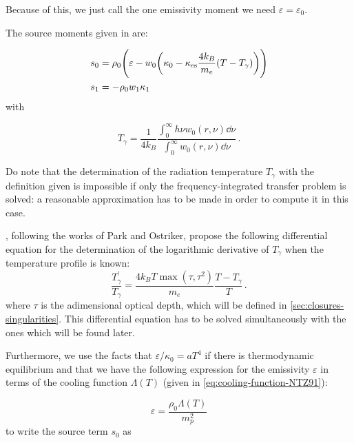\documentclass[main.tex]{subfiles}
\begin{document}
Because of this, we just call the one emissivity moment we need \(\varepsilon = \varepsilon_0\).

The source moments given in \cite[eq. 6]{NobiliTurollaZampieri:1991dec} are:

\begin{subequations}
\begin{align}
  s_0 &= \rho_0 \qty(\varepsilon - w_0 \qty(\kappa_0 - \kappa_{\text{es}} \frac{4 k_B}{m_e} (T - T_\gamma)))  \\
  s_1 &= - \rho_0 w_1 \kappa_1
\end{align}
\end{subequations}
with

\begin{equation}
    T_\gamma = \frac{1}{4 k_B} \frac{\displaystyle \int_0^\infty h \nu w_0 (r, \nu) \dd{\nu}}{\displaystyle \int_0^\infty w_0 (r, \nu) \dd{\nu}}\,.
\end{equation}

Do note that the determination of the radiation temperature \(T_\gamma\) with the definition given is impossible if only the frequency-integrated transfer problem is solved: a reasonable approximation has to be made in order to compute it in this case.

\textcite[eq. 17]{NobiliTurollaZampieri:1991dec}, following the works of Park and Ostriker, propose the following differential equation for the determination of the logarithmic derivative of \(T_\gamma\) when the temperature profile is known:
%
\begin{equation} \label{eq:T-gamma-differential-equation}
  \frac{T_\gamma ^{\prime}}{T_\gamma} = \frac{4 k_B T \max (\tau, \tau^2)}{m_e} \frac{T - T_\gamma}{T}\,.
\end{equation}
%
where \(\tau\) is the adimensional optical depth, which will be defined in \ref{sec:closures-singularities}. This differential equation has to be solved simultaneously with the ones which will be found later.

Furthermore, we use the facts that \(\varepsilon / \kappa_0 = a T^4\) if there is thermodynamic equilibrium and that we have the following expression for the emissivity \(\varepsilon\) in terms of the cooling function \(\Lambda (T)\) (given in \eqref{eq:cooling-function-NTZ91}):

\begin{equation}
    \varepsilon = \frac{\rho_0 \Lambda (T)}{m_p^2}
\end{equation}
to write the source term \(s_0\) as
\end{document}

